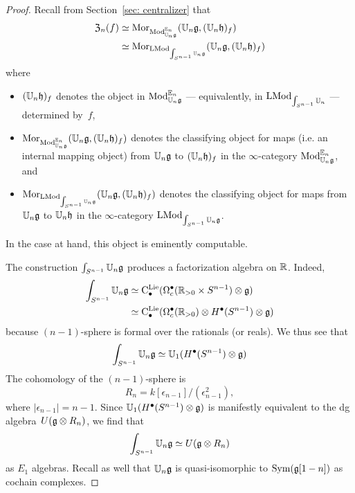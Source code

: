 \documentclass[11pt]{amsart}
\numberwithin{equation}{section}
\begin{document}
\begin{proof}
Recall from Section~\ref{sec: centralizer} that 
\begin{align*}
{\frak Z}_n(f) &\simeq {{\rm Mor}}_{{\rm Mod}^{\mathbb E_n}_{\mathbb U_n\mathfrak g}}(\mathbb U_n \mathfrak g, (\mathbb U_n \mathfrak h)_f) \\
&\simeq {\rm Mor}_{{\rm LMod}_{\int_{S^{n-1}} \mathbb U_n\mathfrak g}}(\mathbb U_n \mathfrak g, (\mathbb U_n \mathfrak h)_f)
\end{align*}
where 
\begin{itemize}
\item $(\mathbb U_n \mathfrak h)_f$ denotes the object in ${\rm Mod}^{\mathbb E_n}_{\mathbb U_n\mathfrak g}$ --- equivalently, in ${\rm LMod}_{\int_{S^{n-1}}\mathbb U_n}$ --- determined by~$f$, 
\item ${\rm Mor}_{{\rm Mod}^{\mathbb E_n}_{\mathbb U_n\mathfrak g}}(\mathbb U_n \mathfrak g, (\mathbb U_n \mathfrak h)_f)$ denotes the classifying object for maps (i.e. an internal mapping object) from $\mathbb U_n\mathfrak g$ to $(\mathbb U_n \mathfrak h)_f$ in the $\infty$-category ${\rm Mod}^{\mathbb E_n}_{\mathbb U_n\mathfrak g}$, and
\item ${\rm Mor}_{{\rm LMod}_{\int_{S^{n-1}} \mathbb U_n\mathfrak g}} (\mathbb U_n \mathfrak g, (\mathbb U_n \mathfrak h)_f)$ denotes the classifying object for maps from ${\mathbb U_n\mathfrak g}$ to $\mathbb U_n \mathfrak h$ in the $\infty$-category ${\rm LMod}_{\int_{S^{n-1}}\mathbb U_n\mathfrak g}$. 
\end{itemize}
In the case at hand, this object is eminently computable.

The construction $\int_{S^{n-1}}\mathbb U_n\mathfrak g$ produces a factorization algebra on $\mathbb R$.
Indeed,
\begin{align*}
\int_{S^{n-1}}\mathbb U_n\mathfrak g 
&\simeq {\rm C}^{\rm Lie}_\bullet(\Omega^\bullet_c(\mathbb R_{> 0} \times S^{n-1}) \otimes \mathfrak g)\\
&\simeq {\rm C}^{\rm Lie}_\bullet(\Omega^\bullet_c(\mathbb R_{> 0}) \otimes H^\bullet(S^{n-1}) \otimes \mathfrak g)
\end{align*}
because $(n-1)$-sphere is formal over the rationals (or reals). 
We thus see that 
\[
\int_{S^{n-1}}\mathbb U_n\mathfrak g \simeq \mathbb U_1 (H^\bullet(S^{n-1}) \otimes \mathfrak g)
\]
The cohomology of the $(n-1)$-sphere is 
\[
R_n = k[\epsilon_{n-1}]/(\epsilon_{n-1}^2),
\] 
where $|\epsilon_{n-1}| = n-1$.
Since $\mathbb U_1 (H^\bullet(S^{n-1}) \otimes \mathfrak g)$ is manifestly equivalent to the dg algebra~$U(\mathfrak g \otimes R_n)$,
we find that 
\[
\int_{S^{n-1}}\mathbb U_n\mathfrak g \simeq U(\mathfrak g \otimes R_n)
\]
as $E_1$ algebras.
Recall as well that $\mathbb U_n \mathfrak g$ is quasi-isomorphic to ${\rm Sym}(\mathfrak g[1-n])$ as cochain complexes.


\end{proof}
\end{document}
